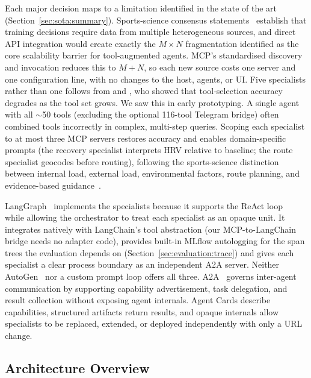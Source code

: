 Each major decision maps to a limitation identified in the state of the art (Section~\ref{sec:sota:summary}). Sports-science consensus statements~\citep{bourdon_monitoring_2017, kellmann_recovery_2018} establish that training decisions require data from multiple heterogeneous sources, and direct API integration would create exactly the $M \times N$ fragmentation \cite{yang_survey_2025} identified as the core scalability barrier for tool-augmented agents. MCP's standardised discovery and invocation reduces this to $M + N$, so each new source costs one server and one configuration line, with no changes to the host, agents, or UI. Five specialists rather than one follows from \cite{qu_tool_2024} and \cite{patil_gorilla_2023}, who showed that tool-selection accuracy degrades as the tool set grows. We saw this in early prototyping. A single agent with all $\sim$50 tools (excluding the optional 116-tool Telegram bridge) often combined tools incorrectly in complex, multi-step queries. Scoping each specialist to at most three MCP servers restores accuracy and enables domain-specific prompts (the recovery specialist interprets HRV relative to baseline; the route specialist geocodes before routing), following the sports-science distinction between internal load, external load, environmental factors, route planning, and evidence-based guidance~\citep{bourdon_monitoring_2017, gabbett_training_2016, kellmann_recovery_2018}.

LangGraph~\citep{langchain_langgraph_2024} implements the specialists because it supports the ReAct loop~\citep{yao_react_2023} while allowing the orchestrator to treat each specialist as an opaque unit. It integrates natively with LangChain's tool abstraction (our MCP-to-LangChain bridge needs no adapter code), provides built-in MLflow autologging for the span trees the evaluation depends on (Section~\ref{sec:evaluation:trace}) and gives each specialist a clear process boundary as an independent A2A server. Neither AutoGen~\citep{wu_autogen_2023} nor a custom prompt loop offers all three. A2A~\citep{google_a2a_2025} governs inter-agent communication by supporting capability advertisement, task delegation, and result collection without exposing agent internals. Agent Cards describe capabilities, structured artifacts return results, and opaque internals allow specialists to be replaced, extended, or deployed independently with only a URL change.

\subsection{Architecture Overview}\label{sec:architecture:overview}

